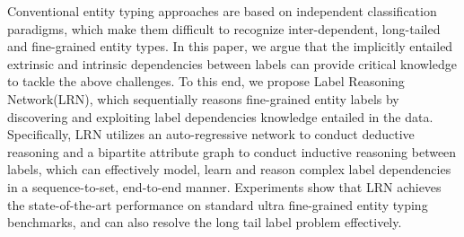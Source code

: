 Conventional entity typing approaches are based on independent classification paradigms, which make them difficult to recognize inter-dependent, long-tailed and fine-grained entity types. In this paper, we argue that the implicitly entailed extrinsic and intrinsic dependencies between labels can provide critical knowledge to tackle the above challenges. To this end, we propose Label Reasoning Network(LRN), which sequentially reasons fine-grained entity labels by discovering and exploiting label dependencies knowledge entailed in the data. Specifically, LRN utilizes an auto-regressive network to conduct deductive reasoning and a bipartite attribute graph to conduct inductive reasoning between labels, which can effectively model, learn and reason complex label dependencies in a sequence-to-set, end-to-end manner. Experiments show that LRN achieves the state-of-the-art performance on standard ultra fine-grained entity typing benchmarks, and can also resolve the long tail label problem effectively.
